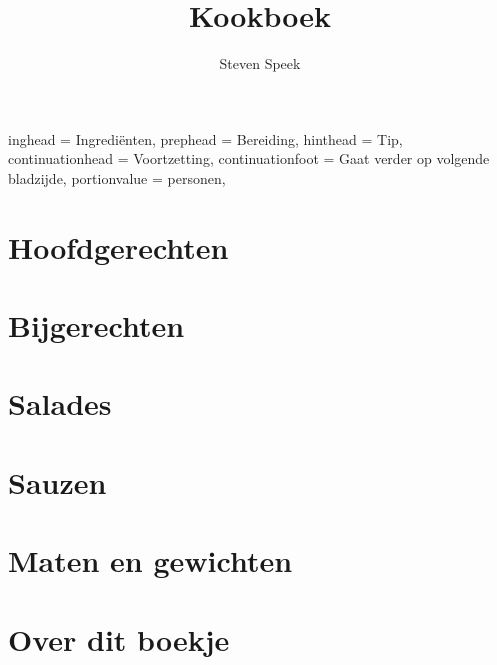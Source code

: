 \documentclass[%
a4paper,
12pt,
openany
]{book}
\begin{document}
\setHeadlines
{%
    inghead = Ingredi\"{e}nten,
    prephead = Bereiding,
    hinthead = Tip,
    continuationhead = Voortzetting,
    continuationfoot = Gaat verder op volgende bladzijde,
    portionvalue = personen,
}

\title{Kookboek}
\author{Steven Speek}

\maketitle

\tableofcontents

\chapter{Hoofdgerechten}
































\chapter{Bijgerechten}



\chapter{Salades}





\chapter{Sauzen}



\appendix

\chapter{Maten en gewichten}



\chapter{Over dit boekje}


\end{document}
